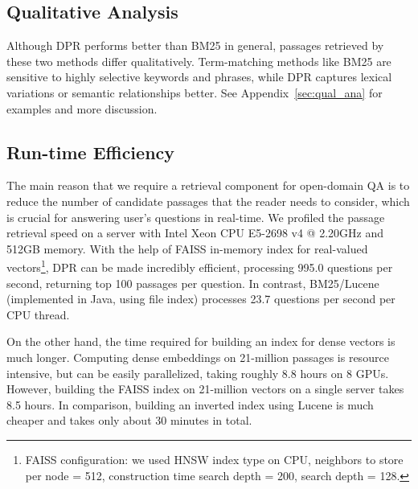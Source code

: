 \documentclass[11pt,a4paper]{article}
\def\model/{DPR}
\newcommand\tf[1]{\textbf{#1}}
\begin{document}
\subsection{Qualitative Analysis}

Although \model/ performs better than BM25 in general, passages retrieved by these two methods differ qualitatively. 
Term-matching methods like BM25 are sensitive to highly selective keywords and phrases, while \model/ captures lexical variations or semantic relationships better.
See Appendix~\ref{sec:qual_ana} for examples and more discussion.


\subsection{Run-time Efficiency}
\label{sec:efficiency}

The main reason that we require a retrieval component for open-domain QA is to reduce the number of candidate passages that the reader needs to consider, which is crucial for answering user's questions in real-time.
We profiled the passage retrieval speed on a server with Intel Xeon CPU E5-2698 v4 @ 2.20GHz and 512GB memory.
With the help of FAISS in-memory index for real-valued vectors\footnote{FAISS configuration: we used HNSW index type on CPU, neighbors to store per node = 512, construction time search depth = 200,  search depth = 128.}, \model/ can be made incredibly efficient, processing 995.0 questions per second, returning top 100 passages per question.
In contrast, BM25/Lucene (implemented in Java, using file index) processes 23.7 questions per second per CPU thread.

On the other hand, the time required for building an index for dense vectors is much longer.
Computing dense embeddings on 21-million passages is resource intensive, but can be easily parallelized, taking roughly 8.8 hours on 8 GPUs.
However, building the FAISS index on 21-million vectors on a single server takes 8.5 hours.
In comparison, building an inverted index using Lucene is much cheaper and takes only about 30 minutes in total. 
\newcommand{\nqbm}{32.6}
\newcommand{\nqsingle}{\tf{41.5}}
\newcommand{\nqsinglehybrid}{39.0}
\newcommand{\nqmulti}{\tf{41.5}}
\newcommand{\nqmultihybrid}{38.8}

\newcommand{\triviabm}{52.4}
\newcommand{\triviasingle}{56.8}
\newcommand{\triviasinglehybrid}{57.0}
\newcommand{\triviamulti}{56.8}
\newcommand{\triviamultihybrid}{\tf{57.9}}

\newcommand{\sqbm}{38.1}
\newcommand{\sqsingle}{29.8}
\newcommand{\sqsinglehybrid}{36.7}
\newcommand{\sqmulti}{24.1}
\newcommand{\sqmultihybrid}{35.8}
\end{document}
